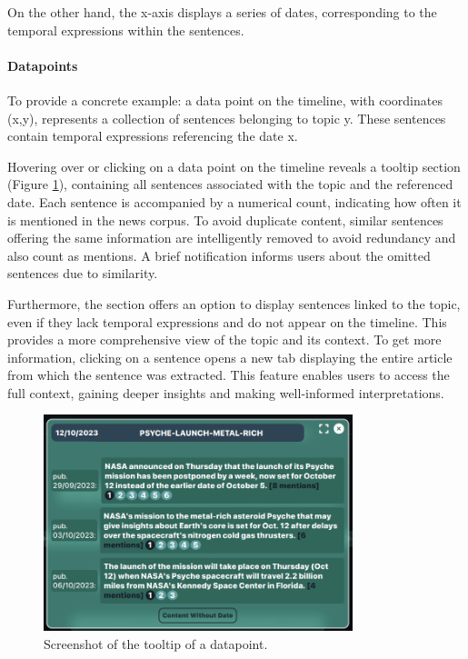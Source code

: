 \documentclass[12pt,oneside,bibtotoc,liststotoc]{scrbook}
\begin{document}
On the other hand, the x-axis displays a series of dates, corresponding to the temporal expressions within the sentences.

\paragraph{Datapoints}
To provide a concrete example: a data point on the timeline, with coordinates (x,y), represents a collection of sentences belonging to topic y. These sentences contain temporal expressions referencing the date x.

Hovering over or clicking on a data point on the timeline reveals a tooltip section (Figure \ref{fig:tooltip_website}), containing all sentences associated with the topic and the referenced date. Each sentence is accompanied by a numerical count, indicating how often it is mentioned in the news corpus. To avoid duplicate content, similar sentences offering the same information are intelligently removed to avoid redundancy and also count as mentions. A brief notification informs users about the omitted sentences due to similarity.

Furthermore, the section offers an option to display sentences linked to the topic, even if they lack temporal expressions and do not appear on the timeline. This provides a more comprehensive view of the topic and its context. To get more information, clicking on a sentence opens a new tab displaying the entire article from which the sentence was extracted. This feature enables users to access the full context, gaining deeper insights and making well-informed interpretations.

\begin{figure}[h]
\centering
\includegraphics[width=9cm]{img/tooltip.png}
\caption{Screenshot of the tooltip of a datapoint.}
\label{fig:tooltip_website}
\end{figure}
\end{document}
